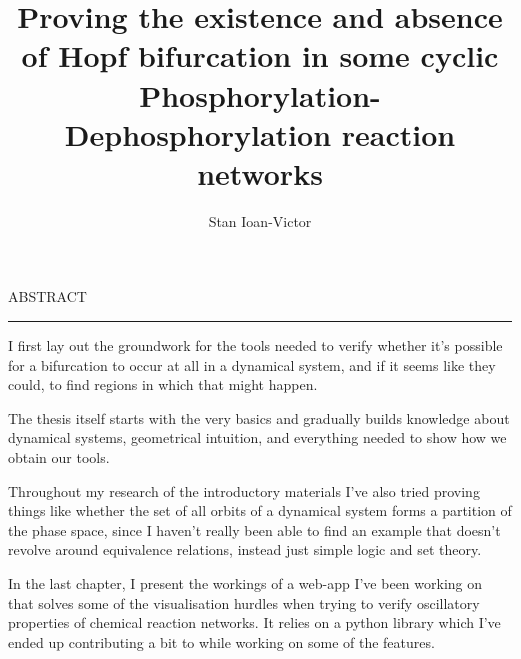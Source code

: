 \documentclass[12pt]{report}
\begin{document}
\theoremstyle{definition}
\newtheorem{theorem}{}
\newtheorem{corollary}[theorem]{Corollary}
\theoremstyle{definition}
\newtheorem{definition}{Definition}
\newtheorem{lemma}{Lemma}
\newtheorem{proposition}{Proposition}

\title{Proving the existence and absence of Hopf bifurcation in some cyclic Phosphorylation-Dephosphorylation reaction networks	}
\author{Stan Ioan-Victor}

\maketitle

\newpage
\thispagestyle{empty}
\mbox{}
\newpage
{}

\cleardoublepage
ABSTRACT
\vspace{0.5cm}
\hrule
\vspace{0.5cm}

I first lay out the groundwork for the tools needed to verify whether it's possible for a bifurcation to occur at all in a dynamical system, and if it seems like they could, to find regions in which that might happen.

The thesis itself starts with the very basics and gradually builds knowledge about dynamical systems, geometrical intuition, and everything needed to show how we obtain our tools.

Throughout my research of the introductory materials I've also tried proving things like whether the set of all orbits of a dynamical system forms a partition of the phase space, since I haven't really been able to find an example that doesn't revolve around equivalence relations, instead just simple logic and set theory.

In the last chapter, I present the workings of a web-app I've been working on that solves some of the visualisation hurdles when trying to verify oscillatory properties of chemical reaction networks. It relies on a python library which I've ended up contributing a bit to while working on some of the features.

\tableofcontents

\newpage
{}










\printbibliography
\end{document}
